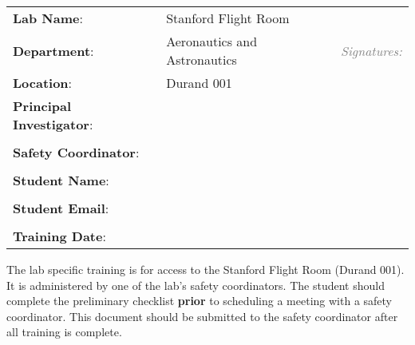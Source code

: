 \documentclass[letterpaper,11pt]{article}
\title{} %
\date{} %
\author{} %
\newcommand{\linespace}{\vspace{4mm}}		%
\newcommand{\grey}[1]{\textcolor{grey}{#1}}
\begin{document}

\pagestyle{fancy}  %
\lfoot{\small{\textit{\grey{Last edited by Eric Cristofalo on \today. }}}}
\cfoot{}

\noindent
\begin{tabular}{lll}
	\textbf{Lab Name}: 			& Stanford Flight Room & \\
	\textbf{Department}: 			& Aeronautics and Astronautics & \qquad\qquad\qquad \textit{\grey{Signatures:}} \\
	\textbf{Location}: 			& Durand 001 & \\
	\textbf{Principal Investigator}:	&  \TextField[name=pi_name, width=6cm]{} & \TextField[name=pi_signature, width=6cm]{}\\
	&\\
	\textbf{Safety Coordinator}:	&  \TextField[name=coordinator_name, width=6cm]{} & \TextField[name=coordinator_signature, width=6cm]{} \\
	&\\
	\textbf{Student Name}:		& \TextField[name=student_name, width=6cm]{} &  \TextField[name=student_signature, width=6cm]{}\\
	&\\
	\textbf{Student Email}:		& \TextField[name=student_email, width=6cm]{} & \\
	&\\
	\textbf{Training Date}:		& \TextField[name=date, width=6cm]{} & \\
\end{tabular}

\linespace\noindent
The lab specific training is for access to the Stanford Flight Room (Durand 001). It is administered by one of the lab's safety coordinators. The student should complete the preliminary checklist \textbf{prior} to scheduling a meeting with a safety coordinator. This document should be submitted to the safety coordinator after all training is complete.
\end{document}
